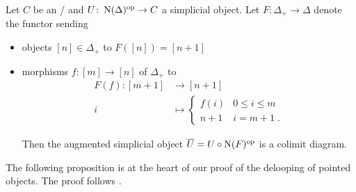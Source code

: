 \begin{prop}\label{prop:shiftIsColimDiam}
    Let $C$ be an \inftycat/ and $U\colon\operatorname{N}(\Delta)^{\operatorname{op}}\to C$ a simplicial object.
    Let $F\colon\Delta_+\to\Delta$ denote the functor sending 
    \begin{itemize}
        \item objects $[n]\in\Delta_+$ to $F([n])=[n+1]$
        \item morphisms $f\colon [m]\to[n]$ of $\Delta_+$ to 
        \begin{align*}
            F(f)\colon [m+1]&\to[n+1]\\
            i&\mapsto
            \begin{cases}
                f(i) & 0\leq i\leq m\\
                n+1 & i=m+1\;.
            \end{cases}
        \end{align*}
        
        Then the augmented simplicial object $\overline{U}=U\circ\operatorname{N}(F)^{\operatorname{op}}$ is a colimit diagram.
    \end{itemize}
    \begin{reference}
        \cite[Lemma 6.1.3.17 (1)]{HTT}
    \end{reference}
\end{prop}
The following proposition is at the heart of our proof of the delooping of pointed objects. 
The proof follows \cite[29-30]{toposes_and_htpy_toposes}.
